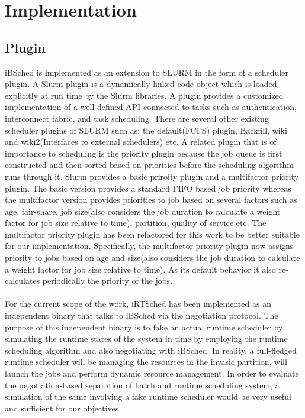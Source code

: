 \chapter{Implementation}\label{chapter:implementation}
\section{Plugin}
iBSched is implemented as an extension to SLURM in the form of a scheduler plugin. A Slurm plugin is a dynamically linked code object which is loaded explicitly at run time by the Slurm libraries. A plugin provides a customized implementation of a well-defined API connected to tasks such as authentication, interconnect fabric, and task scheduling. There are several other existing scheduler plugins of SLURM such as: the default(FCFS) plugin, Backfill, wiki and wiki2(Interfaces to external schedulers) etc. A related plugin that is of importance to scheduling is the priority plugin because the job queue is first constructed and then sorted based on priorities before the scheduling algorithm runs through it. Slurm provides a basic priroity plugin and a multifactor priority plugin. The basic version provides a standard FIFO based job priority whereas the multifactor version provides priorities to job based on several factors such as age, fair-share, job size(also considers the job duration to calculate a weight factor for job size relative to time), partition, quality of service etc. The multifactor priority plugin has been refactored for this work to be better suitable for our implementation. Specifically, the multifactor priority plugin now assigns priority to jobs based on age and size(also considers the job duration to calculate a weight factor for job size relative to time). As its default behavior it also re-calculates periodically the priority of the jobs.\\ \\
For the current scope of the work, iRTSched has been implemented as an independent binary that talks to iBSched via the negotiation protocol. The purpose of this independent binary is to fake an actual runtime scheduler by simulating the runtime states of the system in time by employing the runtime scheduling algorithm and also negotiating with iBSched. In reality, a full-fledged runtime scheduler will be managing the resources in the invasic partition, will launch the jobs and perform dynamic resource management. In order to evaluate the negotiation-based separation of batch and runtime scheduling system, a simulation of the same involving a fake runtime scheduler would be very useful and sufficient for our objectives. 
